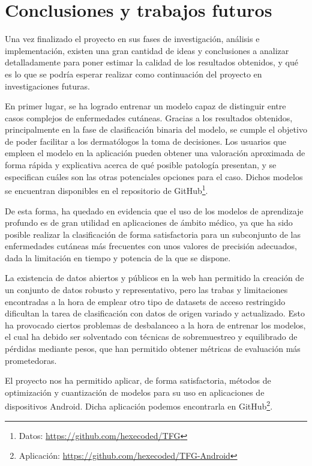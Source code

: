 \chapter{Conclusiones y trabajos futuros}

Una vez finalizado el proyecto en sus fases de investigación, análisis e implementación, existen una gran cantidad de ideas y conclusiones a analizar detalladamente para poner estimar la calidad de los resultados obtenidos, y qué es lo que se podría esperar realizar como continuación del proyecto en investigaciones futuras.

En primer lugar, se ha logrado entrenar un modelo capaz de distinguir entre casos complejos de enfermedades cutáneas. Gracias a los resultados obtenidos, principalmente en la fase de clasificación binaria del modelo, se cumple el objetivo de poder facilitar a los dermatólogos la toma de decisiones.  Los usuarios que empleen el modelo en la aplicación pueden obtener una valoración aproximada de forma rápida y explicativa acerca de qué posible patología presentan, y se especifican cuáles son las otras potenciales opciones para el caso. Dichos modelos se encuentran disponibles en el repositorio de GitHub\footnote{Datos: \url{https://github.com/hexecoded/TFG}}.

De esta forma, ha quedado en evidencia que el uso de los modelos de aprendizaje profundo es de gran utilidad en aplicaciones de ámbito médico, ya que ha sido posible realizar la clasificación de forma satisfactoria para un subconjunto de las enfermedades cutáneas más frecuentes con unos valores de precisión adecuados, dada la limitación en tiempo y potencia de la que se dispone. 

La existencia de datos abiertos  y públicos en la web han permitido la creación de un conjunto de datos robusto y representativo, pero las trabas y limitaciones encontradas a la hora de emplear otro tipo de datasets de acceso restringido dificultan la tarea de clasificación con datos de origen variado y actualizado. Esto ha provocado ciertos problemas de desbalanceo a la hora de entrenar los modelos, el cual ha debido ser solventado con técnicas de sobremuestreo y equilibrado de pérdidas mediante pesos, que han permitido obtener métricas de evaluación más prometedoras.

El proyecto nos ha permitido aplicar, de forma satisfactoria, métodos de optimización y cuantización de modelos para su uso en aplicaciones de dispositivos Android. Dicha aplicación podemos encontrarla en GitHub\footnote{Aplicación: \url{https://github.com/hexecoded/TFG-Android}}.

